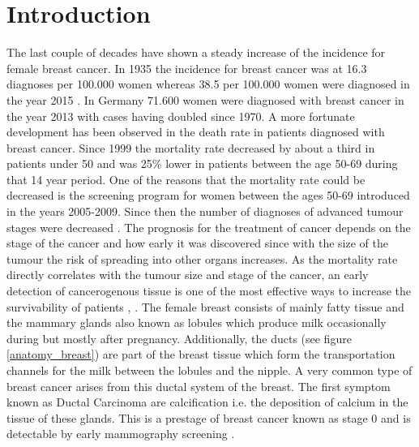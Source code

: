 \chapter{Introduction}
\label{chap:introduction}


The last couple of decades have shown a steady increase of the incidence for female breast cancer.
In 1935 the incidence for breast cancer was at 16.3 diagnoses per 100.000 women whereas 38.5 per 100.000 women were diagnosed in the year 2015 \cite{Lima2020Trends2015}.
In Germany 71.600 women were diagnosed with breast cancer in the year 2013 with cases having doubled since 1970. A more fortunate development has been observed in the death rate in patients diagnosed with breast cancer. Since 1999 the mortality rate decreased by about a third in patients under 50 and was 25\% lower in patients between the age 50-69 during that 14 year period. 
One of the reasons that the mortality rate could be decreased is the screening program for women between the ages 50-69  introduced in the years 2005-2009. Since then the number of diagnoses of advanced tumour stages were decreased \cite{RobertKoch-Institut2016Bericht2016}.
The prognosis for the treatment of cancer depends on the stage of the cancer and how early it was discovered since with the size of the tumour the risk of spreading into other organs increases. As the mortality rate directly correlates with the tumour size and stage of the cancer, an early detection of cancerogenous tissue is one of the most effective ways to increase the survivability of patients \cite{Veronesi1985PrognosisNodes}, \cite{Welch2016Breast-CancerEffectiveness}.
The female breast consists of mainly fatty tissue and the mammary glands also known as lobules which produce milk occasionally during but mostly after pregnancy. Additionally, the ducts (see figure \ref{anatomy_breast}) are part of the breast tissue which form the transportation channels for the milk between the lobules and the nipple.
A very common type of breast cancer arises from this ductal system of the breast. The first symptom known as Ductal Carcinoma are calcification i.e. the deposition of calcium in the tissue of these glands.
This is a prestage of breast cancer known as stage 0 and is detectable by early mammography screening \cite{brestcancer_stages}.  


